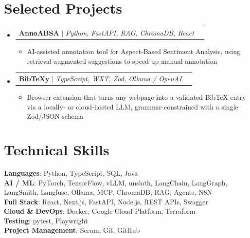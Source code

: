 \documentclass[letterpaper,11pt]{article}
\makeatletter
\newcommand{\resumeItem}[1]{
  \item\small{
    {#1 \vspace{-2pt}}
  }
}
\newcommand{\resumeProjectHeading}[2]{
    \item
    \begin{tabular*}{0.97\textwidth}{l@{\extracolsep{\fill}}r}
      \small#1 & #2 \\
    \end{tabular*}\vspace{-7pt}
}
\newcommand{\resumeSubHeadingListStart}{\begin{itemize}[leftmargin=0.15in, label={}]}
\newcommand{\resumeSubHeadingListEnd}{\end{itemize}}
\newcommand{\resumeItemListStart}{\begin{itemize}}
\newcommand{\resumeItemListEnd}{\end{itemize}\vspace{-5pt}}
\makeatother
\begin{document}
\section{Selected Projects}
    \resumeSubHeadingListStart
      \resumeProjectHeading
          {\textbf{AnnoABSA} $|$ \emph{Python, FastAPI, RAG, ChromaDB, React}}{}
          \resumeItemListStart
            \resumeItem{AI-assisted annotation tool for Aspect-Based Sentiment Analysis, using retrieval-augmented suggestions to speed up manual annotation}
          \resumeItemListEnd
      \resumeProjectHeading
          {\textbf{BibTeXy} $|$ \emph{TypeScript, WXT, Zod, Ollama / OpenAI}}{}
          \resumeItemListStart
            \resumeItem{Browser extension that turns any webpage into a validated BibTeX entry via a locally- or cloud-hosted LLM, grammar-constrained with a single Zod/JSON schema}
          \resumeItemListEnd
    \resumeSubHeadingListEnd


\section{Technical Skills}
 \begin{itemize}[leftmargin=0.15in, label={}]
    \small{\item{
     \textbf{Languages}{: Python, TypeScript, SQL, Java} \\
     \textbf{AI / ML}{: PyTorch, TensorFlow, vLLM, unsloth, LangChain, LangGraph, LangSmith, Langfuse, Ollama, MCP, ChromaDB, RAG, Agents, N8N} \\
     \textbf{Full Stack}{: React, Next.js, FastAPI, Node.js, REST APIs, Swagger} \\
     \textbf{Cloud \& DevOps}{: Docker, Google Cloud Platform, Terraform} \\
     \textbf{Testing}{: pytest, Playwright} \\
     \textbf{Project Management}{: Scrum, Git, GitHub}
    }}
 \end{itemize}


\end{document}

